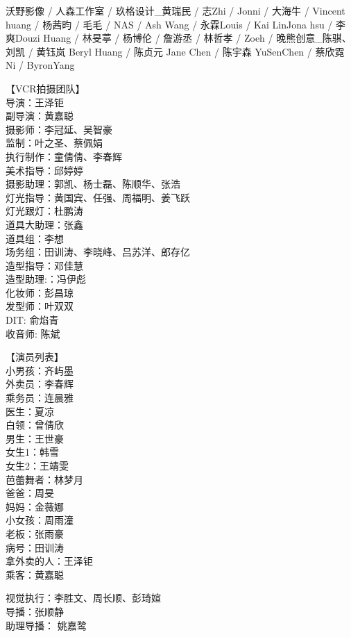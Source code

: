 \documentclass[]{ctexbook}
\begin{document}
沃野影像 / 人森工作室 / 玖格设计\_黄瑞民 /
志Zhi / Jonni / 大海牛 / Vincent huang /
杨茜昀 / 毛毛 / NAS / Ash Wang / 永霖Louis / Kai LinJona hsu /
李爽Douzi Huang / 林旻葶 / 杨博伦 / 詹游丞 / 林哲孝 / Zoeh /
晚熊创意\_陈骐、刘凯 / 黄钰岚 Beryl Huang / 陈贞元 Jane Chen /
陈宇森 YuSenChen / 蔡欣霓 Ni / ByronYang

【VCR拍摄团队】\\
导演：王泽钜\\
副导演：黄嘉聪\\
摄影师：李冠延、吴智豪\\
监制：叶之圣、蔡佩娟\\
执行制作：童倩倩、李春辉\\
美术指导：邱婷婷\\
摄影助理：郭凯、杨士磊、陈顺华、张浩\\
灯光指导：黄国宾、任强、周福明、姜飞跃\\
灯光跟灯：杜鹏涛\\
道具大助理：张鑫\\
道具组：李想\\
场务组：田训涛、李晓峰、吕苏洋、郎存亿\\
造型指导：邓佳慧\\
造型助理:：冯伊彪\\
化妆师：彭昌琼\\
发型师：叶双双\\
DIT: 俞焰青\\
收音师: 陈斌

【演员列表】\\
小男孩：齐屿墨\\
外卖员：李春辉\\
乘务员：连晨雅\\
医生：夏凉\\
白领：曾倩欣\\
男生：王世豪\\
女生1：韩雪\\
女生2：王靖雯\\
芭蕾舞者：林梦月\\
爸爸：周旻\\
妈妈：金薇娜\\
小女孩：周雨潼\\
老板：张雨豪\\
病号：田训涛\\
拿外卖的人：王泽钜\\
乘客：黄嘉聪

视觉执行：李胜文、周长顺、彭琦媗\\
导播：张顺静\\
助理导播： 姚嘉鹭
\end{document}

